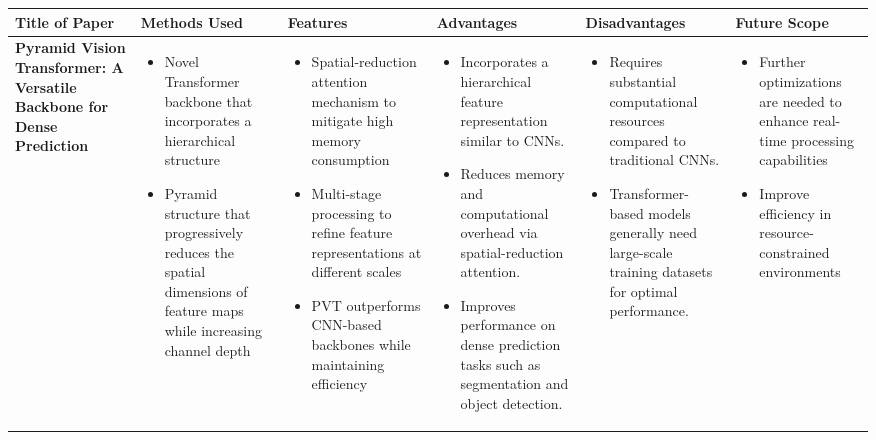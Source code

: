 \documentclass{article}
\begin{document}
\begin{adjustbox}{width=\textwidth}
\begin{tabular}{|p{}|p{}|p{}|p{}|p{}|p{}|}
    \hline
    \rowcolor[HTML]{D3D3D3}
    \textbf{Title of Paper} & \textbf{Methods Used} & \textbf{Features} & \textbf{Advantages} & \textbf{Disadvantages}  & \textbf{Future Scope} \\
      \hline
      \vspace{0.1in}
   \large \textbf{Pyramid Vision Transformer: A Versatile Backbone for Dense Prediction} & 
    \begin{itemize}[leftmargin=*]
        \item Novel Transformer backbone that incorporates a hierarchical structure
        \item Pyramid structure that progressively reduces the spatial dimensions of feature maps while increasing channel depth
    \end{itemize} & 
    \begin{itemize}[leftmargin=*]
        \item Spatial-reduction attention mechanism to mitigate high memory consumption 
        \item Multi-stage processing to refine feature representations at different scales
        \item PVT outperforms CNN-based backbones while maintaining efficiency
    \end{itemize} & 
    \begin{itemize}[leftmargin=*]
        \item Incorporates a hierarchical feature representation similar to CNNs.
        \item Reduces memory and computational overhead via spatial-reduction attention.
        \item Improves performance on dense prediction tasks such as segmentation and object detection.
    \end{itemize} & 
    \begin{itemize}[leftmargin=*]
         \item Requires substantial computational resources compared to traditional CNNs.
    \item Transformer-based models generally need large-scale training datasets for optimal performance.
    \end{itemize} & 
    \begin{itemize}[leftmargin=*]
        \item Further optimizations are needed to enhance real-time processing capabilities \item Improve efficiency in resource-constrained environments

\end{itemize}
\end{tabular}
\end{adjustbox}
\end{document}

